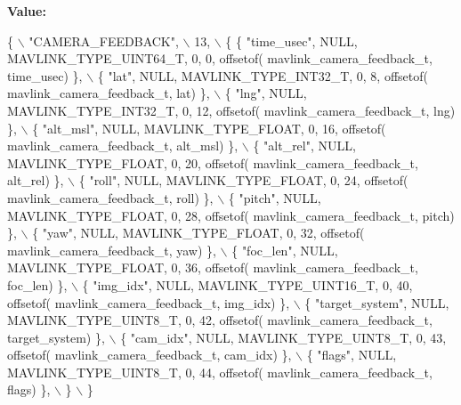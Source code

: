 {\bfseries Value\+:}
\begin{DoxyCode}
\{ \(\backslash\)
    \textcolor{stringliteral}{"CAMERA\_FEEDBACK"}, \(\backslash\)
    13, \(\backslash\)
    \{  \{ \textcolor{stringliteral}{"time\_usec"}, NULL, MAVLINK_TYPE_UINT64_T, 0, 0, offsetof(
      mavlink_camera_feedback_t, time\_usec) \}, \(\backslash\)
         \{ \textcolor{stringliteral}{"lat"}, NULL, MAVLINK_TYPE_INT32_T, 0, 8, offsetof(
      mavlink_camera_feedback_t, lat) \}, \(\backslash\)
         \{ \textcolor{stringliteral}{"lng"}, NULL, MAVLINK_TYPE_INT32_T, 0, 12, offsetof(
      mavlink_camera_feedback_t, lng) \}, \(\backslash\)
         \{ \textcolor{stringliteral}{"alt\_msl"}, NULL, MAVLINK_TYPE_FLOAT, 0, 16, offsetof(
      mavlink_camera_feedback_t, alt\_msl) \}, \(\backslash\)
         \{ \textcolor{stringliteral}{"alt\_rel"}, NULL, MAVLINK_TYPE_FLOAT, 0, 20, offsetof(
      mavlink_camera_feedback_t, alt\_rel) \}, \(\backslash\)
         \{ \textcolor{stringliteral}{"roll"}, NULL, MAVLINK_TYPE_FLOAT, 0, 24, offsetof(
      mavlink_camera_feedback_t, roll) \}, \(\backslash\)
         \{ \textcolor{stringliteral}{"pitch"}, NULL, MAVLINK_TYPE_FLOAT, 0, 28, offsetof(
      mavlink_camera_feedback_t, pitch) \}, \(\backslash\)
         \{ \textcolor{stringliteral}{"yaw"}, NULL, MAVLINK_TYPE_FLOAT, 0, 32, offsetof(
      mavlink_camera_feedback_t, yaw) \}, \(\backslash\)
         \{ \textcolor{stringliteral}{"foc\_len"}, NULL, MAVLINK_TYPE_FLOAT, 0, 36, offsetof(
      mavlink_camera_feedback_t, foc\_len) \}, \(\backslash\)
         \{ \textcolor{stringliteral}{"img\_idx"}, NULL, MAVLINK_TYPE_UINT16_T, 0, 40, offsetof(
      mavlink_camera_feedback_t, img\_idx) \}, \(\backslash\)
         \{ \textcolor{stringliteral}{"target\_system"}, NULL, MAVLINK_TYPE_UINT8_T, 0, 42, offsetof(
      mavlink_camera_feedback_t, target\_system) \}, \(\backslash\)
         \{ \textcolor{stringliteral}{"cam\_idx"}, NULL, MAVLINK_TYPE_UINT8_T, 0, 43, offsetof(
      mavlink_camera_feedback_t, cam\_idx) \}, \(\backslash\)
         \{ \textcolor{stringliteral}{"flags"}, NULL, MAVLINK_TYPE_UINT8_T, 0, 44, offsetof(
      mavlink_camera_feedback_t, flags) \}, \(\backslash\)
         \} \(\backslash\)
\}
\end{DoxyCode}
\mbox{\label{mavlink__msg__camera__feedback_8h_ac906a4455fb6790d282bf02f0e7a99a7}} 
